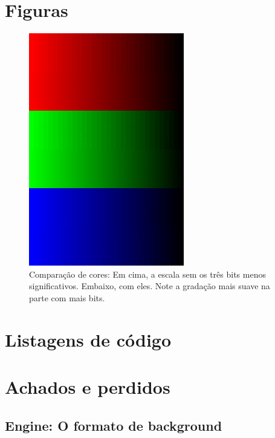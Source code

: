 \documentclass[brazil]{abnt}
\begin{document}




\anexo

\chapter{Figuras}

\begin{figure}[h]
\centering
\includegraphics{imgs/diferenca_cor.png}
\caption[Comparação de cores]{Comparação de cores: Em cima, a escala sem os três bits menos significativos. Embaixo, com eles. Note a gradação mais suave na parte com mais bits.}
\label{img:comparacao} 
\end{figure}

\chapter{Listagens de código}





\chapter{Achados e perdidos}

\section{Engine: O formato de background}
\end{document}

